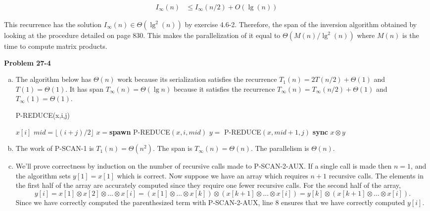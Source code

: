 \documentclass{article}
\begin{document}
\begin{enumerate}[a.]
\begin{align*}
I_\infty(n) &\le I_\infty(n/2) + O(\lg(n))
\end{align*}

This recurrence has the solution $I_\infty(n)\in \Theta(\lg^2(n))$ by exercise 4.6-2. Therefore, the span of the inversion algorithm obtained by looking at the procedure detailed on page 830. This makes the parallelization of it equal to $\Theta(M(n)/\lg^2(n))$ where $M(n)$ is the time to compute matrix products.

\end{enumerate}

\noindent\textbf{Problem 27-4}\\
\begin{enumerate}[a.]
\item The algorithm below has $\Theta(n)$ work because its serialization satisfies the recurrence $T_1(n) = 2T(n/2) + \Theta(1)$ and $T(1) = \Theta(1)$.  It has span $T_\infty(n) = \Theta(\lg n)$ because it satisfies the recurrence $T_\infty(n) = T_\infty(n/2) + \Theta(1)$ and $T_\infty(1) = \Theta(1)$. \\

\begin{algorithm}
\caption{P-REDUCE(x,i,j)}
\begin{algorithmic}[1]
	\State \Return $x[i]$
\Else
	\State $mid = \lfloor (i+j)/2 \rfloor$
	\State $x = $\textbf{spawn} P-REDUCE$(x,i, mid)$
	\State $y = $ P-REDUCE$(x,mid+1, j)$
	\State \textbf{sync}
	\State \Return $x \otimes y$
\EndIf
\end{algorithmic}
\end{algorithm}

\item The work of P-SCAN-1 is $T_1(n) = \Theta(n^2)$.  The span is $T_\infty(n) = \Theta(n)$.  The parallelism is $\Theta(n)$. \\

\item We'll prove correctness by induction on the number of recursive calls made to P-SCAN-2-AUX.  If a single call is made then $n=1$, and the algorithm sets $y[1] = x[1]$ which is correct.  Now suppose we have an array which requires $n+1$ recursive calls.  The elements in the first half of the array are accurately computed since they require one fewer recursive calls. For the second half of the array, 
\[y[i] = x[1] \otimes x[2] \otimes \ldots \otimes x[i] = (x[1] \otimes \ldots \otimes x[k]) \otimes (x[k+1] \otimes \ldots \otimes x[i]) = y[k] \otimes (x[k+1] \otimes \ldots \otimes x[i]).\]
Since we have correctly computed the parenthesized term with P-SCAN-2-AUX, line 8 ensures that we have correctly computed $y[i]$. 


\end{enumerate}
\end{document}
